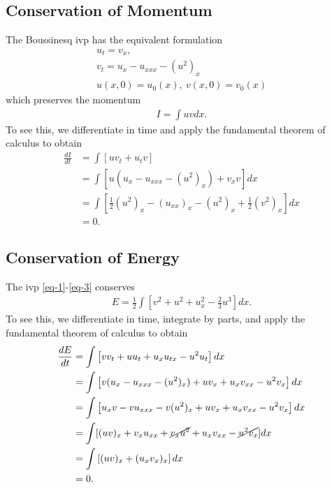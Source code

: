 \documentclass[12pt,reqno]{amsart}
\numberwithin{equation}{section}  %
\begin{document}
\subsection{Conservation of Momentum} 
\label{ssec:c-moment-bous}
The Boussinesq ivp has the equivalent formulation
%
%
\begin{gather}
  u_{t} = v_{x},
  \label{eq-1}
  \\
  v_{t} = u_{x} - u_{xxx} - (u^{2})_{x}
  \label{eq-2}
  \\
  u(x,0) = u_{0}(x), \ v(x,0) = v_{0}(x)
  \label{eq-3}
\end{gather}
%
%
which preserves the momentum 
%
%
\begin{equation*}
\begin{split}
  I = \int u v dx.
\end{split}
\end{equation*}
%
%
To see this, we differentiate in time and apply the fundamental theorem of
calculus to obtain
%
%
\begin{equation*}
\begin{split}
  \frac{dI}{dt} 
  & = \int [u v_{t} + u_{t} v]
  \\
  & = \int [u (u_{x} - u_{xxx} - (u^{2})_{x}) + v_{x} v] dx
  \\
  & = \int \left [\frac{1}{2} (u^{2})_{x} - (u_{xx})_{x} - (u^{2})_{x} + \frac{1}{2}
  (v^{2})_{x} \right ] dx
  \\
  & = 0.
\end{split}
\end{equation*}
%
%
\subsection{Conservation of Energy} 
\label{ssec:c-en-bous}
The ivp \eqref{eq-1}-\eqref{eq-3} conserves 
%
%
\begin{equation*}
\begin{split}
  E = \frac{1}{2} \int \left[ v^{2} + u^{2} + u_{x}^{2} - \frac{2}{3} u^{3} \right] dx.
\end{split}
\end{equation*}
%
%
To see this, we differentiate in time, integrate by parts, and apply
the fundamental theorem of calculus to obtain
%
%
\begin{equation*}
\begin{split}
  \frac{dE}{dt}
  & = \int \left[ v v_{t} + u u_{t} + u_{x} u_{tx} - u^{2}u_{t}
  \right] dx
  \\
  & = \int \left[ v(u_{x} - u_{xxx} - (u^{2})_{x}) + u v_{x} + u_{x}
  v_{xx} - u^{2} v_{x} \right] dx
  \\
  & = \int \left [ u_{x}v - v u_{xxx} - v (u^{2})_{x} + uv_{x} + u_{x} v_{xx} - u^{2}
  v_{x} \right ] dx
  \\
  & = \int [(uv)_{x} + v_{x} u_{xx} + \cancel{v_{x} u^{2}} + u_{x} v_{xx} -
  \cancel{u^{2} v_{x}}]dx
  \\
  & = \int \left[ (uv)_{x} + (u_{x} v_{x})_{x} \right] dx
  \\
  & = 0.
\end{split}
\end{equation*}
%
%
%
%
\end{document}
